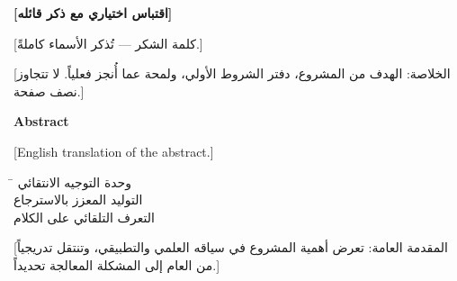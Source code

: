 \documentclass[12pt,letterpaper,oneside]{report}
\begin{document}
\vspace*{4cm}
\begin{center}\bfseries
  [اقتباس اختياري مع ذكر قائله]
\end{center}
\clearpage

[كلمة الشكر — تُذكر الأسماء كاملةً.]
\clearpage

\pagestyle{plain}

[الخلاصة: الهدف من المشروع، دفتر الشروط الأولي، ولمحة عما أُنجز فعلياً.
لا تتجاوز نصف صفحة.]

\vspace{1cm}
\begin{english}
\begin{center}\bfseries\large Abstract\end{center}
[English translation of the abstract.]
\end{english}
\clearpage

\tableofcontents
\clearpage

\listoffigures
\clearpage

\listoftables
\clearpage

\begin{tabbing}
\hspace{6cm}\=\kill
{} \> وحدة التوجيه الانتقائي \\
 \> التوليد المعزز بالاسترجاع \\
 \> التعرف التلقائي على الكلام \\
\end{tabbing}
\clearpage


[المقدمة العامة: تعرض أهمية المشروع في سياقه العلمي والتطبيقي، وتنتقل تدريجياً
من العام إلى المشكلة المعالجة تحديداً.]
\clearpage
\end{document}
